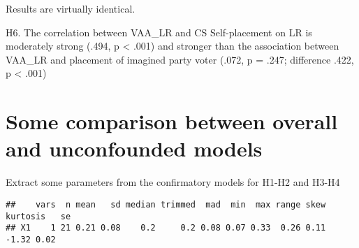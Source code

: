 \documentclass[
]{article}
\newenvironment{Shaded}{\begin{snugshade}}{\end{snugshade}}
\newcommand{\CommentTok}[1]{\textcolor[rgb]{0.56,0.35,0.01}{\textit{#1}}}
\newcommand{\DecValTok}[1]{\textcolor[rgb]{0.00,0.00,0.81}{#1}}
\newcommand{\KeywordTok}[1]{\textcolor[rgb]{0.13,0.29,0.53}{\textbf{#1}}}
\newcommand{\NormalTok}[1]{#1}
\newcommand{\OperatorTok}[1]{\textcolor[rgb]{0.81,0.36,0.00}{\textbf{#1}}}
\newcommand{\StringTok}[1]{\textcolor[rgb]{0.31,0.60,0.02}{#1}}
\begin{document}
\begin{Shaded}
\end{Shaded}

Results are virtually identical.

H6. The correlation between VAA\_LR and CS Self-placement on LR is
moderately strong (.494, p \textless{} .001) and stronger than the
association between VAA\_LR and placement of imagined party voter (.072,
p = .247; difference .422, p \textless{} .001)

\newpage

\hypertarget{some-comparison-between-overall-and-unconfounded-models}{%
\section{Some comparison between overall and unconfounded
models}\label{some-comparison-between-overall-and-unconfounded-models}}

Extract some parameters from the confirmatory models for H1-H2 and H3-H4

\begin{Shaded}
\end{Shaded}

\begin{verbatim}
##    vars  n mean   sd median trimmed  mad  min  max range skew kurtosis   se
## X1    1 21 0.21 0.08    0.2     0.2 0.08 0.07 0.33  0.26 0.11    -1.32 0.02
\end{verbatim}
\end{document}
